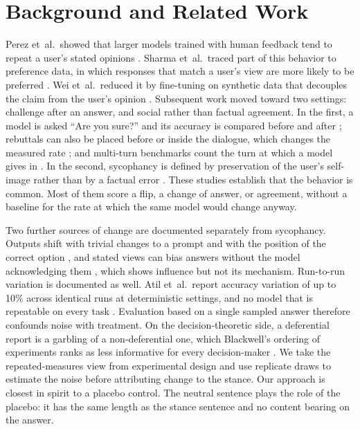 \documentclass[journal]{IEEEtran}
\begin{document}
\section{Background and Related Work}
Perez et~al.\ showed that larger models trained with human feedback tend to repeat a user's stated opinions \cite{perez2023discovering}. Sharma et~al.\ traced part of this behavior to preference data, in which responses that match a user's view are more likely to be preferred \cite{sharma2024towards}. Wei et~al.\ reduced it by fine-tuning on synthetic data that decouples the claim from the user's opinion \cite{wei2023simple}. Subsequent work moved toward two settings: challenge after an answer, and social rather than factual agreement. In the first, a model is asked ``Are you sure?'' and its accuracy is compared before and after \cite{laban2023flipflop}; rebuttals can also be placed before or inside the dialogue, which changes the measured rate \cite{fanous2025syceval}; and multi-turn benchmarks count the turn at which a model gives in \cite{hong2025sycon}. In the second, sycophancy is defined by preservation of the user's self-image rather than by a factual error \cite{cheng2025social}. These studies establish that the behavior is common. Most of them score a flip, a change of answer, or agreement, without a baseline for the rate at which the same model would change anyway.

Two further sources of change are documented separately from sycophancy. Outputs shift with trivial changes to a prompt \cite{sclar2024quantifying} and with the position of the correct option \cite{zheng2024large}, and stated views can bias answers without the model acknowledging them \cite{turpin2023language}, which shows influence but not its mechanism. Run-to-run variation is documented as well. Atil et~al.\ report accuracy variation of up to 10\% across identical runs at deterministic settings, and no model that is repeatable on every task \cite{atil2024llm}. Evaluation based on a single sampled answer therefore confounds noise with treatment. On the decision-theoretic side, a deferential report is a garbling of a non-deferential one, which Blackwell's ordering of experiments ranks as less informative for every decision-maker \cite{blackwell1953equivalent}. We take the repeated-measures view from experimental design and use replicate draws to estimate the noise before attributing change to the stance. Our approach is closest in spirit to a placebo control. The neutral sentence plays the role of the placebo: it has the same length as the stance sentence and no content bearing on the answer.
\end{document}
